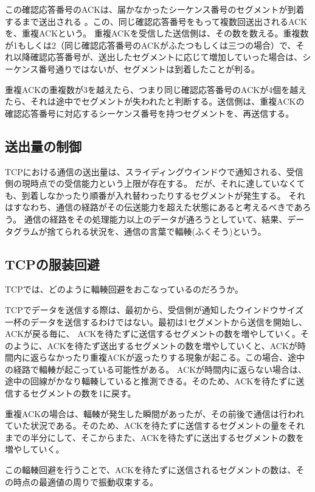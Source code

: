 この確認応答番号のACKは、届かなかったシーケンス番号のセグメントが到着するまで送出される
。この、同じ確認応答番号をもって複数回送出されるACKを、重複ACKという。
重複ACKを受信した送信側は、その数を数える。重複数が1もしくは2（同じ確認応答番号のACKがふたつもしくは三つの場合）で、それ以降確認応答番号が、送出したセグメントに応じて増加していった場合は、シーケンス番号通りではないが、セグメントは到着したことが判る。

重複ACKの重複数が3を越えたら、つまり同じ確認応答番号のACKが4個を越えたら、それは途中でセグメントが失われたと判断する。送信側は、重複ACKの確認応答番号に対応するシーケンス番号を持つセグメントを、再送信する。

\subsection{送出量の制御}

TCPにおける通信の送出量は、スライディングウインドウで通知される、受信側の現時点での受信能力という上限が存在する。
だが、それに達していなくても、到着しなかったり順番が入れ替わったりするセグメントが発生する。
それはすなわち、通信の経路がその伝送能力を超えた状態にあると考えるべきであろう。
通信の経路をその処理能力以上のデータが通ろうとしていて、結果、データグラムが捨てられる状況を、通信の言葉で輻輳(ふくそう)という。

\subsection{TCPの服装回避}
TCPでは、どのように輻輳回避をおこなっているのだろうか。

TCPでデータを送信する際は、最初から、受信側が通知したウインドウサイズ一杯のデータを送信するわけではない。最初は1セグメントから送信を開始し、ACKが戻る毎に、 ACKを待たずに送信するセグメントの数を増やしていく。そのように、ACKを待たず送出するセグメントの数を増やしていくと、ACKが時間内に返らなかったり重複ACKが返ったりする現象が起こる。この場合、途中の経路で輻輳が起こっている可能性がある。
ACKが時間内に返らない場合は、途中の回線がかなり輻輳していると推測できる。そのため、ACKを待たずに送信するセグメントの数を1に戻す。

重複ACKの場合は、輻輳が発生した瞬間があったが、その前後で通信は行われていた状況である。そのため、ACKを待たずに送信するセグメントの量をそれまでの半分にして、そこからまた、ACKを待たずに送出するセグメントの数を増やしていく。

この輻輳回避を行うことで、ACKを待たずに送信されるセグメントの数は、その時点の最適値の周りで振動収束する。



